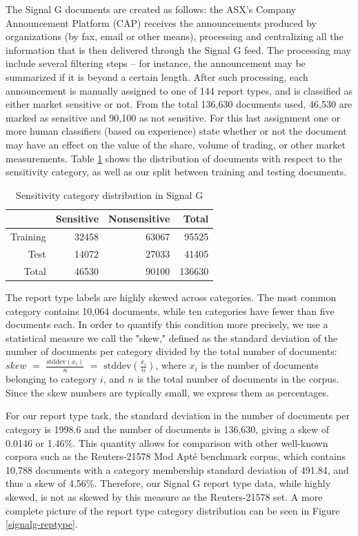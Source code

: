 \documentclass[a4paper,twocolumn]{article}
\begin{document}
The Signal G documents are created as follows: the ASX's Company Announcement Platform (CAP) receives the announcements produced by organizations (by fax, email or other means), processing and centralizing all the information that is then delivered through the Signal G feed. The processing may include several filtering steps -- for instance, the announcement may be summarized if it is beyond a certain length.  After such processing, each announcement is manually assigned to one of 144 report types, and is classified as either market sensitive or not. From the total 136,630 documents used, 46,530 are marked as sensitive and 90,100 as not sensitive. For this last assignment one or more human classifiers (based on experience) state whether or not the document may have an effect on the value of the share, volume of trading, or other market measurements.  Table \ref{signalg-sensitivity} shows the distribution of documents with respect to the sensitivity category, as well as our split between training and testing documents.

\begin{table}
\begin{tabular}{|r|r|r|r|}
\hline
         & Sensitive & Nonsensitive & Total \\
\hline
Training & 32458     & 63067        & 95525 \\
\hline
Test     & 14072     & 27033        & 41405 \\
\hline
Total    & 46530     & 90100        & 136630\\
\hline
\end{tabular}
\caption{Sensitivity category distribution in Signal G}
\label{signalg-sensitivity}
\end{table}

The report type labels are highly skewed across categories.  The most common category contains 10,064 documents, while ten categories have fewer than five documents each.  In order to quantify this condition more precisely, we use a statistical measure we call the "skew," defined as the standard deviation of the number of documents per category divided by the total number of documents: $skew$ $=$ $\frac{\textrm{stddev}(x_i)}{n}$ $=$ $\textrm{stddev}(\frac{x_i}{n})$, where $x_i$ is the number of documents belonging to category $i$, and $n$ is the total number of documents in the corpus.  Since the skew numbers are typically small, we express them as percentages.

For our report type task, the standard deviation in the number of documents per category is 1998.6 and the number of documents is 136,630, giving a skew of 0.0146 or 1.46\%.  This quantity allows for comparison with other well-known corpora such as the Reuters-21578 Mod Apt\'e benchmark corpus, which contains 10,788 documents with a category membership standard deviation of 491.84, and thus a skew of 4.56\%.  Therefore, our Signal G report type data, while highly skewed, is not as skewed by this measure as the Reuters-21578 set.  A more complete picture of the report type category distribution can be seen in Figure \ref{signalg-reptype}.
\end{document}
